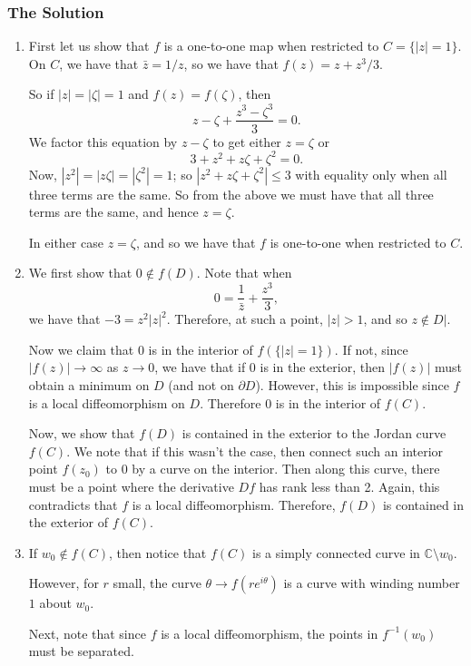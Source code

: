 \subsubsection*{The Solution}
\begin{enumerate}
\item First let us show that \(f\) is a one-to-one map when restricted to \(C = \{|z| = 1\}\). On \(C\),
we have that \(\bar z = 1 / z\), so we have that \(f(z) = z + z^3 / 3\). 

So if \(|z| = |\zeta| = 1\) and \(f(z) = f(\zeta)\), then 
\begin{equation}
z - \zeta + \frac{z^3 - \zeta^3}{3} = 0. 
\end{equation}
We factor this equation by \(z - \zeta\) to get either \(z =\zeta\) or
\begin{equation}
3 + z^2 + z\zeta + \zeta^2 = 0.
\end{equation}
Now, \(|z^2| = |z\zeta| = |\zeta^2| = 1\); so \(|z^2 + z\zeta + \zeta^2| \leq 3\) with equality only when
all three terms are the same. So from the above we must have that all three terms are the same, and hence
\(z = \zeta\).

In either case \(z = \zeta\), and so we have that \(f\) is one-to-one when restricted to \(C\).

\item We first show that \(0 \not \in f(D)\). Note that when
\begin{equation}
0 = \frac{1}{\bar z} + \frac{z^3}{3},
\end{equation}
we have that \(-3 = z^2 |z|^2\). Therefore, at such a point, \(|z| > 1\), and so \(z \not \in D|\).

Now we claim that \(0\) is in the interior of \(f(\{|z| = 1\})\). If not, since \(|f(z)| \to \infty\)
as \(z \to 0\), we have that if \(0\) is in the exterior, then \(|f(z)|\) must obtain a minimum on \(D\)
(and not on \(\partial D\)). However, this is impossible since \(f\) is a local diffeomorphism on \(D\). 
Therefore \(0\) is in the interior of \(f(C)\).

Now, we show that \(f(D)\) is contained in the exterior to the Jordan curve \(f(C)\). We note that if this
wasn't the case, then connect such an interior point \(f(z_0)\) to \(0\) by a curve on the interior. Then
along this curve, there must be a point where the derivative \(Df\) has rank less than 2. Again, this
contradicts that \(f\) is a local diffeomorphism. Therefore, \(f(D)\) is contained in the exterior of \(f(C)\).

\item If \(w_0 \not \in f(C)\), then notice that \(f(C)\) is a simply connected
curve in \(\mathbb C\setminus{w_0}\). 

However, for \(r\) small, the curve \(\theta \to f(re^{i\theta})\) is a curve with winding number \(1\) about
\(w_0\). 

Next, note that since \(f\) is a local diffeomorphism, the points in \(f^{-1}(w_0)\) must be separated. 
\end{enumerate}
